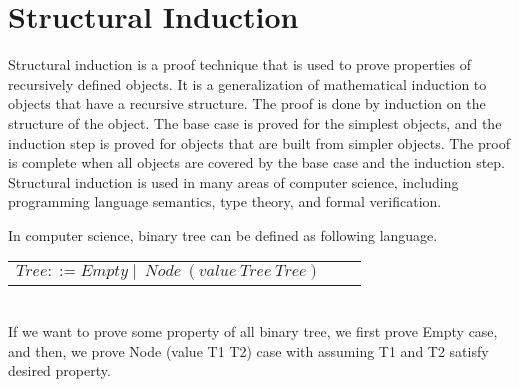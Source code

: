 \section{Structural Induction}
\label{sec:structural}
Structural induction is a proof technique that is used to prove properties of recursively defined objects.
It is a generalization of mathematical induction to objects that have a recursive structure.
The proof is done by induction on the structure of the object.
The base case is proved for the simplest objects, and the induction step is proved for objects that are built from simpler objects.
The proof is complete when all objects are covered by the base case and the induction step.
Structural induction is used in many areas of computer science, including programming language semantics, type theory, and formal verification.
\begin{example}
    In computer science, binary tree can be defined as following language. \\
    \begin{tabular}{rcl}        
    $Tree ::= Empty \mid\ Node\ (value\ Tree\ Tree) $ 
    \end{tabular} \\
    If we want to prove some property of all binary tree, we first prove Empty case, and then, we prove Node (value T1 T2) case with assuming
    T1 and T2 satisfy desired property.
\end{example}